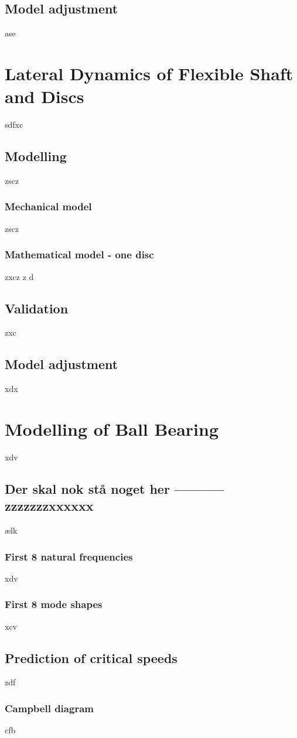 \subsection{Model adjustment}
ase
\section{Lateral Dynamics of Flexible Shaft and Discs}
sdfxc
\subsection{Modelling}
zscz
\subsubsection{Mechanical model}
zscz
\subsubsection{Mathematical model - one disc}
zxcz
z d
\subsection{Validation}
zxc
\subsection{Model adjustment}
xdx
\section{Modelling of Ball Bearing}
xdv
\subsection{Der skal nok stå noget her -----------zzzzzzzxxxxxx}
ælk
\subsubsection{First 8 natural frequencies}
xdv
\subsubsection{First 8 mode shapes}
xcv
\subsection{Prediction of critical speeds}
zdf
\subsubsection{Campbell diagram}
cfb
